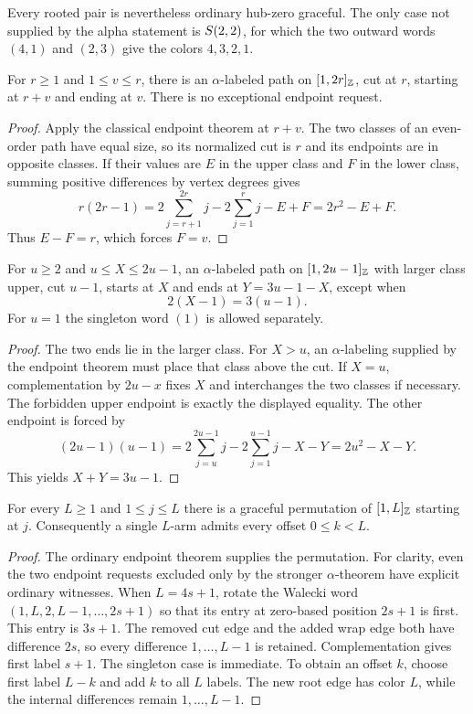 Every rooted pair is nevertheless ordinary hub-zero graceful. The only
case not supplied by the alpha statement is $S\!\left(2,2\right)$, for which the
two outward words $(4,1)$ and $(2,3)$ give the colors $4,3,2,1$.

\begin{lemma}\label{common:even-path}
For $r\ge1$ and $1\le v\le r$, there is an $\alpha$-labeled path
on $[1,2r]_{\mathbb Z}$, cut at $r$, starting at $r+v$ and ending at
$v$. There is no exceptional endpoint request.
\end{lemma}
\begin{proof}
Apply the classical endpoint theorem at $r+v$. The two classes of an
even-order path have equal size, so its normalized cut is $r$ and its
endpoints are in opposite classes. If their values are $E$ in the
upper class and $F$ in the lower class, summing positive differences
by vertex degrees gives
\[
 r(2r-1)=2\!\sum_{j=r+1}^{2r}j-2\!\sum_{j=1}^rj-E+F
             =2r^2-E+F.
\]
Thus $E-F=r$, which forces $F=v$.
\end{proof}

\begin{lemma}\label{common:odd-path}
For $u\ge2$ and $u\le X\le2u-1$, an $\alpha$-labeled path on
$[1,2u-1]_{\mathbb Z}$ with larger class upper, cut $u-1$, starts at
$X$ and ends at $Y=3u-1-X$, except when
\[
 2(X-1)=3(u-1).
\]
For $u=1$ the singleton word $(1)$ is allowed separately.
\end{lemma}
\begin{proof}
The two ends lie in the larger class. For $X>u$, an
$\alpha$-labeling supplied by the endpoint theorem must place that
class above the cut. If $X=u$, complementation by $2u-x$ fixes $X$
and interchanges the two classes if necessary. The forbidden upper
endpoint is exactly the displayed equality. The other endpoint is
forced by
\[
 (2u-1)(u-1)
 =2\!\sum_{j=u}^{2u-1}j-2\!\sum_{j=1}^{u-1}j-X-Y
 =2u^2-X-Y.
\]
This yields $X+Y=3u-1$.
\end{proof}

\begin{lemma}\label{common:prescribed-first-path}
For every $L\ge1$ and $1\le j\le L$ there is a graceful
permutation of $[1,L]_{\mathbb Z}$ starting at $j$. Consequently a
single $L$-arm admits every offset $0\le k<L$.
\end{lemma}
\begin{proof}
The ordinary endpoint theorem supplies the permutation. For clarity,
even the two endpoint requests excluded only by the stronger
$\alpha$-theorem have explicit ordinary witnesses. When $L=4s+1$,
rotate the Walecki word
$(1,L,2,L-1,\ldots,2s+1)$ so that its entry at zero-based position
$2s+1$ is first. This entry is $3s+1$. The removed cut edge and the
added wrap edge both have difference $2s$, so every difference
$1,\ldots,L-1$ is retained. Complementation gives first label $s+1$.
The singleton case is immediate. To obtain an offset $k$, choose
first label $L-k$ and add $k$ to all $L$ labels. The new root edge
has color $L$, while the internal differences remain $1,\ldots,L-1$.
\end{proof}

